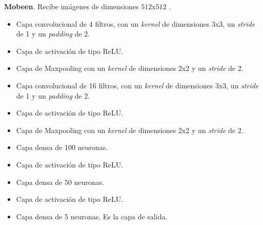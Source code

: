 \textbf{Mobeen}. Recibe imágenes de dimensiones $512$x$512$ \cite{CNNarch:Mobeen}.
\begin{itemize}
    \item Capa convolucional de 4 filtros, con un \textit{kernel} de dimensiones 3x3, un \textit{stride} de 1 y un \textit{padding} de 2.
    \item Capa de activación de tipo ReLU.
    \item Capa de Maxpooling con un \textit{kernel} de dimensiones 2x2 y un \textit{stride} de 2.
    \item Capa convolucional de 16 filtros, con un \textit{kernel} de dimensiones 3x3, un \textit{stride} de 1 y un \textit{padding} de 2.
    \item Capa de activación de tipo ReLU.
    \item Capa de Maxpooling con un \textit{kernel} de dimensiones 2x2 y un \textit{stride} de 2.
    \item Capa densa de 100 neuronas.
    \item Capa de activación de tipo ReLU.
    \item Capa densa de 50 neuronas.
    \item Capa de activación de tipo ReLU.
    \item Capa densa de 5 neuronas. Es la capa de salida.
\end{itemize}

